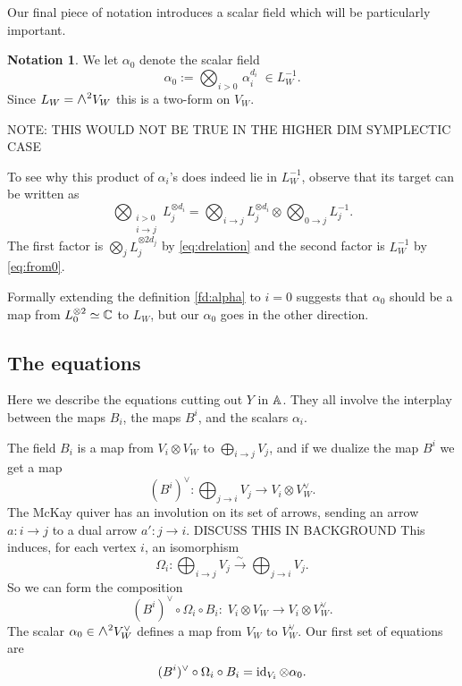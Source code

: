 \documentclass{amsart}
\theoremstyle{definition}
\newtheorem{notn}[theorem]{Notation}
\newcommand\pgap{\vspace{10pt}}
\newcommand{\Wedge}{\mbox{\scalebox{1.2}{$\wedge$}}}
\newcommand\isoto{\stackrel{\sim}{\longrightarrow}}
\newcommand\VW{V_W}
\newcommand\Y{Y}
\begin{document}
Our final piece of notation introduces a scalar field which will be particularly important.

\begin{notn}
We let $\alpha_0$ denote the scalar field 
$$\alpha_0:= \bigotimes_{i>0} \,\alpha_i^{d_i}\;\in  L_W^{-1}.$$
Since $L_W=\Wedge^2 \VW$ this is a two-form on $\VW$.

NOTE: THIS WOULD NOT BE TRUE IN THE HIGHER DIM SYMPLECTIC CASE
\end{notn}
To see why this product of $\alpha_i$'s does indeed lie in $L_W^{-1}$, observe that its target can be written as
$$ \bigotimes_{\substack{i>0 \\ i\to j}} L_j^{\otimes d_i} = \bigotimes_{i\to j} L_j^{\otimes d_i}  \otimes\bigotimes _{0\to j} L_j^{-1}.$$
The first factor is $\bigotimes_{j} L_j^{\otimes 2d_j}$ by \eqref{eq:drelation} and the second factor is $L_W^{-1}$ by \eqref{eq:from0}.  


\begin{remark} Formally extending the definition \eqref{fd:alpha} to $i=0$ suggests that $\alpha_0$ should be a map from $L_0^{\otimes 2}\simeq \mathbb{C}$ to $L_W$, but our $\alpha_0$ goes in the other direction. 
\end{remark}




\subsection{The equations}
Here we describe the equations cutting out $\Y$ in $\mathbb{A}$. They all involve the interplay between the maps $B_i$, the maps $B^i$, and the scalars $\alpha_i$. 
\pgap

The field $B_i$ is a map from $V_i\otimes \VW$ to $\bigoplus_{i\to j} V_j$, and if we dualize the map $B^i$ we get a map
$$(B^i)^\vee: \bigoplus_{j \to i} V_j \longrightarrow V_i\otimes \VW^\vee.$$
The McKay quiver has an involution on its set of arrows, sending an arrow $a:i\to j$ to a dual arrow $a':j\to i$. DISCUSS THIS IN BACKGROUND
This induces, for each vertex $i$, an isomorphism
$$ \Omega_i: \bigoplus_{i\to j} V_j \isoto \bigoplus_{j\to i} V_j. $$
So we can form the composition 
$$(B^i)^\vee\circ\Omega_i\circ B_i :\; V_i \otimes \VW \longrightarrow V_i\otimes \VW^\vee.$$
The scalar $\alpha_0\in \Wedge^2 \VW^\vee$ defines a map from $\VW$ to $\VW^\vee$. Our first set of equations are
\begin{equation}\label{eq:rel1}
(B^i)^\vee\circ\Omega_i\circ B_i  = \operatorname{id}_{V_i} \otimes \alpha_0.
\end{equation}
\end{document}

